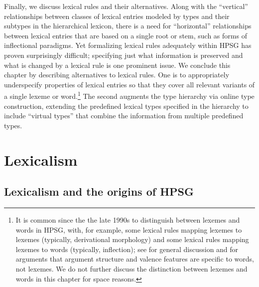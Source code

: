 \documentclass[output=paper,biblatex,babelshorthands,newtxmath,draftmode,colorlinks,citecolor=brown]{langscibook}
\begin{document}
\largerpage
Finally, we discuss lexical rules and their alternatives.  Along with the ``vertical'' relationships
between classes of lexical entries modeled by types and their subtypes in the hierarchical lexicon,
there is a need for ``horizontal'' relationships between lexical entries that are based on a single
root or stem, such as forms of inflectional paradigms.  Yet formalizing lexical rules adequately
within HPSG has proven surprisingly difficult; specifying just what information is preserved and
what is changed by a lexical rule is one prominent issue.  We conclude this chapter by describing
alternatives to lexical rules.  One is to appropriately underspecify properties of lexical entries
so that they cover all relevant variants of a single lexeme or word.\footnote{%
It is common since the the late 1990s to distinguish between lexemes and words in HPSG, with, for
example, some lexical rules mapping lexemes to lexemes (typically, derivational morphology) and some
lexical rules mapping lexemes to words (typically, inflection); see
\citet[176--178]{BonamiandCrysmann2018} for general discussion and \citet{RunnerandAranovich2003}
for arguments that argument structure and valence features are specific to words, not lexemes. We do
not further discuss the distinction between lexemes and words in this chapter for space reasons.}
The second augments the type
hierarchy via online type construction, extending the predefined lexical types specified in the
hierarchy to include ``virtual types'' that combine the information from multiple predefined types.



\section{Lexicalism}
\label{sec:lex}
\subsection{Lexicalism and the origins of HPSG}
\end{document}
